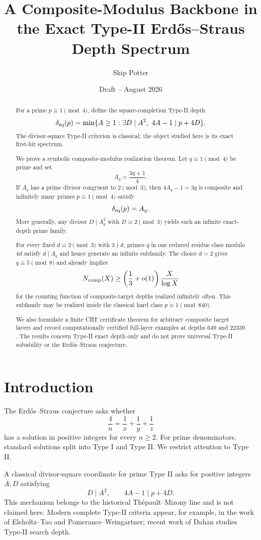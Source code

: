 \documentclass[11pt]{article}
\title{A Composite-Modulus Backbone in the Exact Type-II Erd\H{o}s--Straus Depth Spectrum}
\author{Skip Potter}
\date{Draft -- August 2026}
\theoremstyle{definition}
\begin{document}
\maketitle

\begin{abstract}
For a prime $p\equiv1\pmod4$, define the square-completion Type-II depth
\[
\delta_{\rm sq}(p)=\min\{A\ge1:\exists D\mid A^2,\ 4A-1\mid p+4D\}.
\]
The divisor-square Type-II criterion is classical; the object studied here is its exact first-hit spectrum.

We prove a symbolic composite-modulus realization theorem.  Let $q\equiv1\pmod4$ be prime and set
\[
A_q=\frac{3q+1}{4}.
\]
If $A_q$ has a prime divisor congruent to $2\pmod3$, then $4A_q-1=3q$ is composite and infinitely many primes $p\equiv1\pmod4$ satisfy
\[
\delta_{\rm sq}(p)=A_q.
\]
More generally, any divisor $D\mid A_q^2$ with $D\equiv2\pmod3$ yields such an infinite exact-depth prime family.

For every fixed $d\equiv2\pmod3$ with $3\nmid d$, primes $q$ in one reduced residue class modulo $4d$ satisfy $d\mid A_q$ and hence generate an infinite subfamily.  The choice $d=2$ gives $q\equiv5\pmod8$ and already implies
\[
N_{\rm comp}(X)\ge\left(\frac13+o(1)\right)\frac{X}{\log X}
\]
for the counting function of composite-target depths realized infinitely often.  This subfamily may be realized inside the classical hard class $p\equiv1\pmod{840}$.

We also formulate a finite CRT certificate theorem for arbitrary composite target layers and record computationally certified full-layer examples at depths $649$ and $22339$.  The results concern Type-II exact depth only and do not prove universal Type-II solvability or the Erd\H{o}s--Straus conjecture.
\end{abstract}

\section{Introduction}
The Erd\H{o}s--Straus conjecture asks whether
\[
\frac4n=\frac1x+\frac1y+\frac1z
\]
has a solution in positive integers for every $n\ge2$.  For prime denominators, standard solutions split into Type I and Type II.  We restrict attention to Type II.

A classical divisor-square coordinate for prime Type II asks for positive integers $A,D$ satisfying
\[
D\mid A^2,\qquad 4A-1\mid p+4D. \tag{1}
\]
This mechanism belongs to the historical Th\'epault--Mizony line and is not claimed here.  Modern complete Type-II criteria appear, for example, in the work of Elsholtz--Tao and Pomerance--Weingartner; recent work of Dahan studies Type-II search depth.
\end{document}
